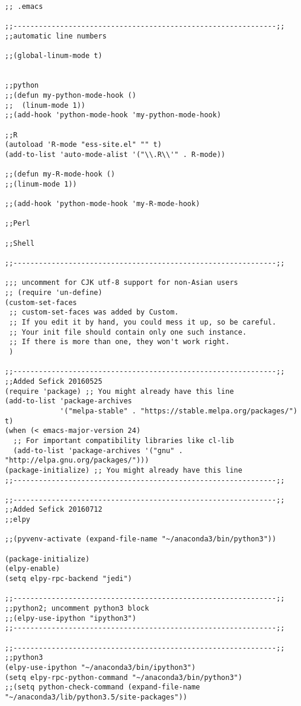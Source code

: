 \documentclass[11pt]{article}
\begin{document}
\begin{verbatim}
;; .emacs

;;--------------------------------------------------------------;;
;;automatic line numbers

;;(global-linum-mode t)


;;python
;;(defun my-python-mode-hook () 
;;  (linum-mode 1)) 
;;(add-hook 'python-mode-hook 'my-python-mode-hook) 

;;R
(autoload 'R-mode "ess-site.el" "" t)
(add-to-list 'auto-mode-alist '("\\.R\\'" . R-mode))

;;(defun my-R-mode-hook () 
;;(linum-mode 1)) 

;;(add-hook 'python-mode-hook 'my-R-mode-hook) 

;;Perl

;;Shell

;;--------------------------------------------------------------;;

;;; uncomment for CJK utf-8 support for non-Asian users
;; (require 'un-define)
(custom-set-faces
 ;; custom-set-faces was added by Custom.
 ;; If you edit it by hand, you could mess it up, so be careful.
 ;; Your init file should contain only one such instance.
 ;; If there is more than one, they won't work right.
 )

;;--------------------------------------------------------------;;
;;Added Sefick 20160525
(require 'package) ;; You might already have this line
(add-to-list 'package-archives
             '("melpa-stable" . "https://stable.melpa.org/packages/") t)
(when (< emacs-major-version 24)
  ;; For important compatibility libraries like cl-lib
  (add-to-list 'package-archives '("gnu" . "http://elpa.gnu.org/packages/")))
(package-initialize) ;; You might already have this line
;;--------------------------------------------------------------;;

;;--------------------------------------------------------------;;
;;Added Sefick 20160712
;;elpy

;;(pyvenv-activate (expand-file-name "~/anaconda3/bin/python3"))

(package-initialize)
(elpy-enable)
(setq elpy-rpc-backend "jedi") 

;;--------------------------------------------------------------;;
;;python2; uncomment python3 block
;;(elpy-use-ipython "ipython3")
;;--------------------------------------------------------------;;

;;--------------------------------------------------------------;;
;;python3
(elpy-use-ipython "~/anaconda3/bin/ipython3")
(setq elpy-rpc-python-command "~/anaconda3/bin/python3")
;;(setq python-check-command (expand-file-name "~/anaconda3/lib/python3.5/site-packages"))


\end{verbatim}
\end{document}
